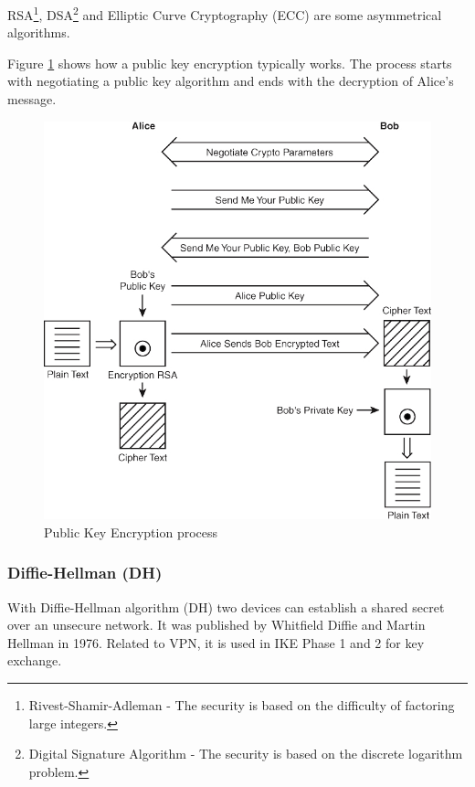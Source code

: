 \documentclass[a4paper]{report}
\begin{document}
RSA\footnote{Rivest-Shamir-Adleman - The security is based on the difficulty of factoring large integers.}, DSA\footnote{Digital Signature Algorithm - The security is based on the discrete logarithm problem.} and Elliptic Curve Cryptography (ECC) are some asymmetrical algorithms. \parencite{Bollapragada2005}

Figure \ref{fig:asym_alg} shows how a public key encryption typically works. The process starts with negotiating a public key algorithm and ends with the decryption of Alice's message.
\begin{figure}[htb]
	\includegraphics[keepaspectratio,width=\linewidth]{asym_alg.jpg}
	\caption{Public Key Encryption process}
	\label{fig:asym_alg}
\end{figure}
\newpage
\subsubsection{Diffie-Hellman (DH)}
\label{sssec:diffie-hellman}
With Diffie-Hellman algorithm (DH) two devices can establish a shared secret over an unsecure network. It was published by Whitfield Diffie and Martin Hellman in 1976. Related to VPN, it is used in IKE Phase 1 and 2 for key exchange. 
\end{document}
